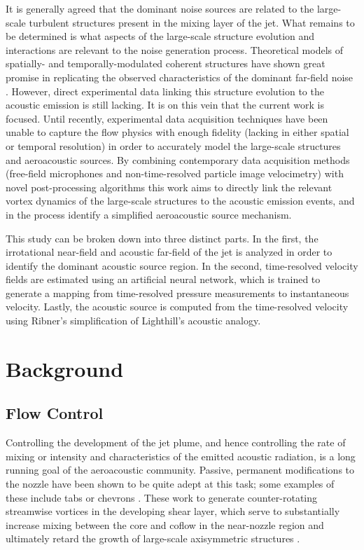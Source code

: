 It is generally agreed that the dominant noise sources are related to the large-scale turbulent structures present in the mixing layer of the jet. 
What remains to be determined is what aspects of the large-scale structure evolution and interactions are relevant to the noise generation process. 
Theoretical models of spatially- and temporally-modulated coherent structures have shown great promise in replicating the observed characteristics of the dominant far-field noise \citep{Cavalieri2010}. 
However, direct experimental data linking this structure evolution to the acoustic emission is still lacking. 
It is on this vein that the current work is focused.
Until recently, experimental data acquisition techniques have been unable to capture the flow physics with enough fidelity (lacking in either spatial or temporal resolution) in order to accurately model the large-scale structures and aeroacoustic sources.
By combining contemporary data acquisition methods (free-field microphones and non-time-resolved particle image velocimetry) with novel post-processing algorithms this work aims to directly link the relevant vortex dynamics of the large-scale structures to the acoustic emission events, and in the process identify a simplified aeroacoustic source mechanism. 

This study can be broken down into three distinct parts. 
In the first, the irrotational near-field and acoustic far-field of the jet is analyzed in order to identify the dominant acoustic source region.
In the second, time-resolved velocity fields are estimated using an artificial neural network, which is trained to generate a mapping from time-resolved pressure measurements to instantaneous velocity.
Lastly, the acoustic source is computed from the time-resolved velocity using Ribner's simplification of Lighthill's acoustic analogy.  
	
\section{Background}
\subsection{Flow Control}
\label{sec:flow_instabilities}
Controlling the development of the jet plume, and hence controlling the rate of mixing or intensity and characteristics of the emitted acoustic radiation, is a long running goal of the aeroacoustic community.
Passive, permanent modifications to the nozzle have been shown to be quite adept at this task; some examples of these include tabs or chevrons \citep{Bridges2004}. 
These work to generate counter-rotating streamwise vortices in the developing shear layer, which serve to substantially increase mixing between the core and coflow in the near-nozzle region and ultimately retard the growth of large-scale axisymmetric structures \citep{Samimy1993}.

